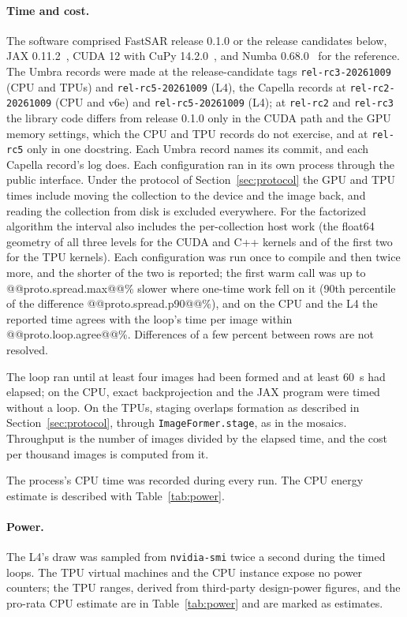 \documentclass[11pt]{article}
\begin{document}
\paragraph{Time and cost.} The software comprised FastSAR release 0.1.0 or the release candidates below, JAX 0.11.2~\cite{jax2018}, CUDA 12 with CuPy 14.2.0~\cite{okuta2017}, and Numba 0.68.0~\cite{lam2015} for the reference. The Umbra records were made at the release-candidate tags \texttt{rel-rc3-20261009} (CPU and TPUs) and \texttt{rel-rc5-20261009} (L4), the Capella records at \texttt{rel-rc2-20261009} (CPU and v6e) and \texttt{rel-rc5-20261009} (L4); at \texttt{rel-rc2} and \texttt{rel-rc3} the library code differs from release 0.1.0 only in the CUDA path and the GPU memory settings, which the CPU and TPU records do not exercise, and at \texttt{rel-rc5} only in one docstring. Each Umbra record names its commit, and each Capella record's log does. Each configuration ran in its own process through the public interface. Under the protocol of Section~\ref{sec:protocol} the GPU and TPU times include moving the collection to the device and the image back, and reading the collection from disk is excluded everywhere. For the factorized algorithm the interval also includes the per-collection host work (the float64 geometry of all three levels for the CUDA and C++ kernels and of the first two for the TPU kernels). Each configuration was run once to compile and then twice more, and the shorter of the two is reported; the first warm call was up to @@proto.spread.max@@\% slower where one-time work fell on it (90th percentile of the difference @@proto.spread.p90@@\%), and on the CPU and the L4 the reported time agrees with the loop's time per image within @@proto.loop.agree@@\%. Differences of a few percent between rows are not resolved. 

The loop ran until at least four images had been formed and at least 60~s had elapsed; on the CPU, exact backprojection and the JAX program were timed without a loop. On the TPUs, staging overlaps formation as described in Section~\ref{sec:protocol}, through \texttt{ImageFormer.stage}, as in the mosaics. Throughput is the number of images divided by the elapsed time, and the cost per thousand images is computed from it. 

The process's CPU time was recorded during every run. The CPU energy estimate is described with Table~\ref{tab:power}.

\paragraph{Power.} The L4's draw was sampled from \texttt{nvidia-smi} twice a second during the timed loops. The TPU virtual machines and the CPU instance expose no power counters; the TPU ranges, derived from third-party design-power figures, and the pro-rata CPU estimate are in Table~\ref{tab:power} and are marked as estimates.
\end{document}
